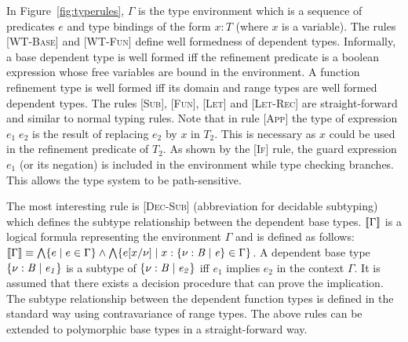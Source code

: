 %
In Figure~\ref{fig:typerules}, $\Gamma$ is the type environment which is a sequence of predicates $e$ and type bindings of the form $\mathit{x:T}$ (where $x$ is a variable). The rules \textsc{[WT-Base]} and \textsc{[WT-Fun]} define well formedness of dependent types. Informally, a base dependent type is well formed iff the refinement predicate is a boolean expression whose free variables are bound in the environment. A function refinement type is well formed iff its domain and range types are well formed dependent types. The rules \textsc{[Sub]}, \textsc{[Fun]}, \textsc{[Let]} and \textsc{[Let-Rec]} are straight-forward and similar to normal typing rules.
Note that in rule \textsc{[App]} the type of expression $e_1 \; e_2$ is the result 
of replacing $e_2$ by $x$ in $T_2$. This is necessary as $x$ could be used in the refinement predicate of $T_2$. As shown 
by the \textsc{[If]} rule, the guard expression $e_1$ (or its negation) is included in the environment while type checking branches. This allows the type system to be path-sensitive. 

The most interesting rule is \textsc{[Dec-Sub]} (abbreviation for decidable subtyping) which defines the subtype relationship between the dependent base types. $[\![\Gamma]\!]$ is a logical formula representing the environment $\Gamma$ and is defined as follows:
$[\![\Gamma]\!] \equiv \bigwedge \{ e \; | \; e \in \Gamma \} \wedge \bigwedge \{ e[x/\nu] \; | \; x:\mathit{\{ \nu:B \; | \; e\}} \in \Gamma \}$. 
A dependent base type $\mathit{\{ \nu:B \; | \; e_1\}}$ is a subtype of $\mathit{\{ \nu:B \; | \; e_2\}}$ iff 
$e_1$ implies $e_2$ in the context $\Gamma$. 
It is assumed that there exists a decision procedure that can prove the implication.
The subtype relationship between the dependent function types is defined in the standard way using contravariance of range types.
The above rules can be extended to polymorphic base types in a straight-forward way.

